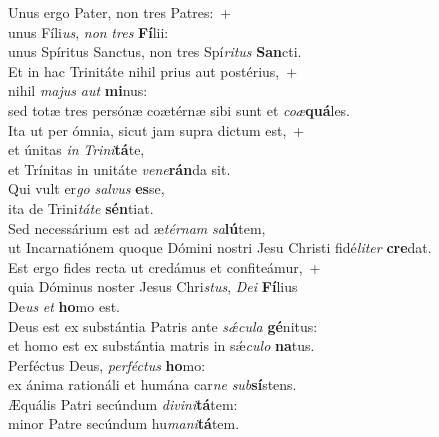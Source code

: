 \oddverse Unus ergo Pater, non tres Patres:~+\\
\oddverse  unus Fíli\textit{us}, \textit{non} \textit{tres} \textbf{Fí}lii:~\*\\
\oddverse unus Spíritus Sanctus, non tres Spí\textit{ri}\textit{tus} \textbf{San}cti.\\
\evenverse Et in hac Trinitáte nihil prius aut postérius,~+\\
\evenverse  nihil \textit{ma}\textit{jus} \textit{aut} \textbf{mi}nus:~\*\\
\evenverse sed totæ tres persónæ coætérnæ sibi sunt et \textit{co}\textit{æ}\textbf{quá}les.\\
\oddverse Ita ut per ómnia, sicut jam supra dictum est,~+\\
\oddverse  et únitas \textit{in} \textit{Tri}\textit{ni}\textbf{tá}te,~\*\\
\oddverse et Trínitas in unitáte \textit{ve}\textit{ne}\textbf{rán}da sit.\\
\evenverse Qui vult er\textit{go} \textit{sal}\textit{vus} \textbf{es}se,~\*\\
\evenverse ita de Trini\textit{tá}\textit{te} \textbf{sén}tiat.\\
\oddverse Sed necessárium est ad æ\textit{tér}\textit{nam} \textit{sa}\textbf{lú}tem,~\*\\
\oddverse ut Incarnatiónem quoque Dómini nostri Jesu Christi fidé\textit{li}\textit{ter} \textbf{cre}dat.\\
\evenverse Est ergo fides recta ut credámus et confiteámur,~+\\
\evenverse  quia Dóminus noster Jesus Chri\textit{stus}, \textit{De}\textit{i} \textbf{Fí}lius~\*\\
\evenverse De\textit{us} \textit{et} \textbf{ho}mo est.\\
\oddverse Deus est ex substántia Patris ante \textit{sǽ}\textit{cu}\textit{la} \textbf{gé}nitus:~\*\\
\oddverse et homo est ex substántia matris in sǽ\textit{cu}\textit{lo} \textbf{na}tus.\\
\evenverse Perféctus Deus, \textit{per}\textit{fé}\textit{ctus} \textbf{ho}mo:~\*\\
\evenverse ex ánima rationáli et humána car\textit{ne} \textit{sub}\textbf{sí}stens.\\
\oddverse Æquális Patri secúndum \textit{di}\textit{vi}\textit{ni}\textbf{tá}tem:~\*\\
\oddverse minor Patre secúndum hu\textit{ma}\textit{ni}\textbf{tá}tem.\\
